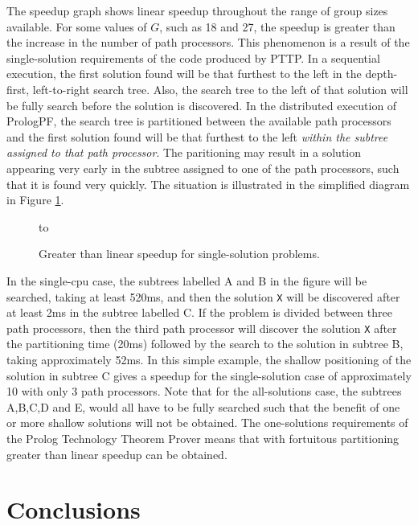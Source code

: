 The speedup graph shows linear speedup throughout the range of group sizes available.
For some values of $G$, such as 18 and 27, the speedup is greater than the increase in
the number of path processors.  This phenomenon is a result of the single-solution
requirements of the code produced by PTTP.  In a sequential execution, the first
solution found will be that furthest to the left in the depth-first, left-to-right
search tree.  Also, the search tree to the left of that solution will be fully
search before the solution is discovered.  In the distributed execution of PrologPF,
the search tree is partitioned between the available path processors and the first
solution found will be that furthest to the left \textit{within the subtree assigned to
that path processor}.  The paritioning may result in a solution appearing very early
in the subtree assigned to one of the path processors, such that it is found very
quickly.  The situation is illustrated in the simplified diagram in Figure \ref{super_linear}.

\begin{figure}[htbp]
\vspace{5mm} \hbox to 
\caption{Greater than linear speedup for single-solution problems.}
\vspace{5mm}
\label{super_linear}
\end{figure}

In the single-cpu case, the subtrees labelled A and B in the figure will be searched, taking
at least 520ms, and then the solution \texttt{X} 
will be discovered after at least 2ms in the subtree labelled C.
If the problem is divided between three path processors, then the third path processor will
discover the solution \texttt{X} 
after the partitioning time (20ms) followed by the search to
the solution in subtree B, taking approximately 52ms.  In this simple example, the
shallow positioning of the solution in subtree C gives a speedup for the single-solution
case of approximately 10 with only 3 path processors.  Note that for the all-solutions case,
the subtrees A,B,C,D and E, would all have to be fully searched such that the benefit of
one or more shallow solutions will not be obtained.
The one-solutions requirements of the Prolog Technology Theorem Prover means that with
fortuitous partitioning greater than linear speedup can be obtained.

\section{Conclusions} %

